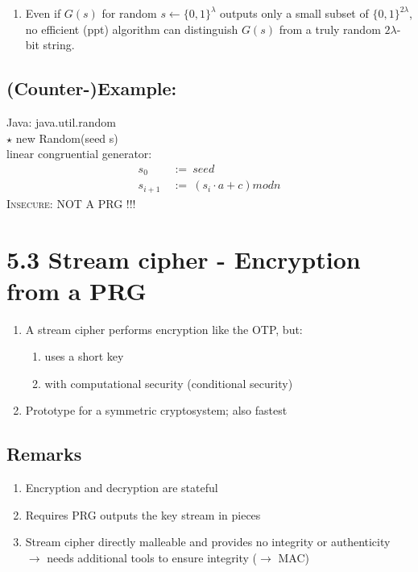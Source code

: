 \documentclass{report}
\begin{document}
			\begin{enumerate}[\textbullet]
				\item Even if $G(s)$ for random $s \leftarrow \{ 0,1 \} ^{\lambda}$ outputs only a small subset of $\{ 0,1 \} ^{2\lambda}$, no efficient (ppt) algorithm can distinguish $G(s)$ from a truly random $2\lambda$-bit string.
			\end{enumerate}
\newpage
		\subsection*{(Counter-)Example:}
			Java: java.util.random \\
			$\star$ new Random(seed s) \\
			linear congruential generator:
			\begin{align*}
				s_0 \ & := \ seed \\
				s_{i+1} \ & := \ (s_i \cdot a +c) mod n
			\end{align*}
			\textsc{Insecure:} NOT A PRG !!!
		
	\section*{5.3 Stream cipher - Encryption from a PRG}
		\begin{enumerate}[\textbullet]
			\item A stream cipher performs encryption like the OTP, but:
			\begin{enumerate}[-]
				\item uses a short key
				\item with computational security (conditional security)
			\end{enumerate}
			\item Prototype for a symmetric cryptosystem; also fastest
		\end{enumerate}
		\subsection*{Remarks}
		\begin{enumerate}[\textbullet]
			\item Encryption and decryption are stateful
			\item Requires PRG outputs the key stream in pieces
			\item Stream cipher directly malleable and provides no integrity or authenticity \\
				$\rightarrow$ needs additional tools to ensure integrity ($\rightarrow$ MAC)
		\end{enumerate}
\newpage
\end{document}
